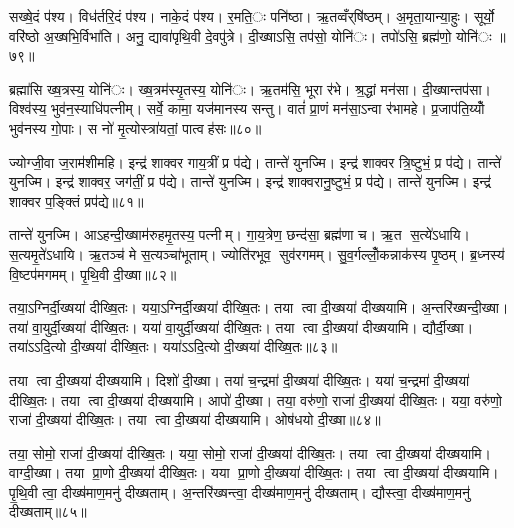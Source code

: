 
सख्षे॒दं प॑श्य। विध॑र्तरि॒दं प॑श्य। नाके॒दं प॑श्य। र॒मति॒ः पनि॑ष्ठा। ऋ॒तव्वँर्‌षि॑ष्ठम्। अ॒मृता॒यान्या॒हुः। सूर्यो॒ वरि॑ष्ठो अ॒ख्षभि॒र्विभा॑ति। अनु॒ द्यावा॑पृथि॒वी दे॒वपु॑त्रे। दी॒ख्षाऽसि॒ तप॑सो॒ योनि॑ः। तपो॑ऽसि॒ ब्रह्म॑णो॒ योनि॑ः ॥७९॥

ब्रह्मा॑सि ख्ष॒त्रस्य॒ योनि॑ः। ख्ष॒त्रम॑स्यृ॒तस्य॒ योनि॑ः। ऋ॒तम॑सि॒ भूरा र॑भे। श्र॒द्धां मन॑सा। दी॒ख्षान्तप॑सा। विश्व॑स्य॒ भुव॑न॒स्याधि॑पत्नीम्। सर्वे॒ कामा॒ यज॑मानस्य सन्तु। वातं॑ प्रा॒णं मन॑सा॒ऽन्वा र॑भामहे। प्र॒जाप॑ति॒य्योँ भुव॑नस्य गो॒पाः। स नो॑ मृ॒त्योस्त्रा॑यतां॒ पात्वह॑सः॥८०॥

ज्योग्जी॒वा ज॒राम॑शीमहि। इन्द्र॑ शाक्वर गाय॒त्रीं प्र प॑द्ये। तान्ते॑ युनज्मि। इन्द्र॑ शाक्वर त्रि॒ष्टुभं॒ प्र प॑द्ये। तान्ते॑ युनज्मि। इन्द्र॑ शाक्वर॒ जग॑तीं॒ प्र प॑द्ये। तान्ते॑ युनज्मि। इन्द्र॑ शाक्वरानु॒ष्टुभं॒ प्र प॑द्ये। तान्ते॑ युनज्मि। इन्द्र॑ शाक्वर प॒ङ्क्तिं प्रप॑द्ये॥८१॥

तान्ते॑ युनज्मि। आऽहन्दी॒ख्षाम॑रुहमृ॒तस्य॒ पत्नीम्। गा॒य॒त्रेण॒ छन्द॑सा॒ ब्रह्म॑णा च। ऋ॒त स॒त्ये॑ऽधायि। स॒त्यमृ॒ते॑ऽधायि। ऋ॒तञ्च॑ मे स॒त्यञ्चा॑भूताम्। ज्योति॑रभूव॒ सुव॑रगमम्। सु॒व॒र्गल्लोँ॒कन्नाक॑स्य पृ॒ष्ठम्। ब्र॒ध्नस्य॑ वि॒ष्टप॑मगमम्। पृ॒थि॒वी दी॒ख्षा॥८२॥

तया॒ऽग्निर्दी॒ख्षया॑ दीख्षि॒तः। यया॒ऽग्निर्दी॒ख्षया॑ दीख्षि॒तः। तया त्वा दी॒ख्षया॑ दीख्षयामि। अ॒न्तरि॑ख्षन्दी॒ख्षा। तया॑ वा॒युर्दी॒ख्षया॑ दीख्षि॒तः। यया॑ वा॒युर्दी॒ख्षया॑ दीख्षि॒तः। तया त्वा दी॒ख्षया॑ दीख्षयामि। द्यौर्दी॒ख्षा। तया॑ऽऽदि॒त्यो दी॒ख्षया॑ दीख्षि॒तः। यया॑ऽऽदि॒त्यो दी॒ख्षया॑ दीख्षि॒तः॥८३॥

तया त्वा दी॒ख्षया॑ दीख्षयामि। दिशो॑ दी॒ख्षा। तया॑ च॒न्द्रमा॑ दी॒ख्षया॑ दीख्षि॒तः। यया॑ च॒न्द्रमा॑ दी॒ख्षया॑ दीख्षि॒तः। तया त्वा दी॒ख्षया॑ दीख्षयामि। आपो॑ दी॒ख्षा। तया॒ वरु॑णो॒ राजा॑ दी॒ख्षया॑ दीख्षि॒तः। यया॒ वरु॑णो॒ राजा॑ दी॒ख्षया॑ दीख्षि॒तः। तया त्वा दी॒ख्षया॑ दीख्षयामि। ओष॑धयो दी॒ख्षा॥८४॥

तया॒ सोमो॒ राजा॑ दी॒ख्षया॑ दीख्षि॒तः। यया॒ सोमो॒ राजा॑ दी॒ख्षया॑ दीख्षि॒तः। तया त्वा दी॒ख्षया॑ दीख्षयामि। वाग्दी॒ख्षा। तया प्रा॒णो दी॒ख्षया॑ दीख्षि॒तः। यया प्रा॒णो दी॒ख्षया॑ दीख्षि॒तः। तया त्वा दी॒ख्षया॑ दीख्षयामि। पृ॒थि॒वी त्वा॒ दीख्ष॑माण॒मनु॑ दीख्षताम्। अ॒न्तरि॑ख्षन्त्वा॒ दीख्ष॑माण॒मनु॑ दीख्षताम्। द्यौस्त्वा॒ दीख्ष॑माण॒मनु॑ दीख्षताम्॥८५॥

